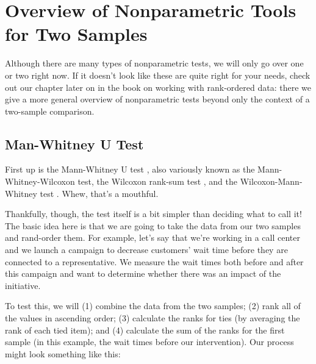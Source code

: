 \section{Overview of Nonparametric Tools for Two Samples}

Although there are many types of nonparametric tests, we will only go over one or two right now. If it doesn't look like these are quite right for your needs, check out our chapter later on in the book on working with rank-ordered data: there we give a more general overview of nonparametric tests beyond only the context of a two-sample comparison.

\subsection{Man-Whitney U Test}

First up is the Mann-Whitney U test , also variously known as the Mann-Whitney-Wilcoxon  test, the Wilcoxon rank-sum test , and the Wilcoxon-Mann-Whitney test . Whew, that's a mouthful.

Thankfully, though, the test itself is a bit simpler than deciding what to call it! The basic idea here is that we are going to take the data from our two samples and rand-order them. For example, let's say that we're working in a call center and we launch a campaign to decrease customers' wait time before they are connected to a representative. We measure the wait times both before and after this campaign and want to determine whether there was an impact of the initiative.

To test this, we will (1) combine the data from the two samples; (2) rank all of the values in ascending order; (3) calculate the ranks for ties (by averaging the rank of each tied item); and (4) calculate the sum of the ranks for the first sample (in this example, the wait times before our intervention). Our process might look something like this:

